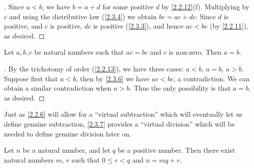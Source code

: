 \begin{proof}[]
  Since \(a < b\), we have \(b = a + d\) for some positive \(d\) by \cref{2.2.12}(f).
  Multiplying by \(c\) and using the distributive law (\cref{2.3.4}) we obtain \(bc = ac + dc\).
  Since \(d\) is positive, and \(c\) is positive, \(dc\) is positive (\cref{2.3.3}), and hence \(ac < bc\) (by \cref{2.2.11}), as desired.
\end{proof}

\begin{cor}\label{2.3.7}
  Let \(a, b, c\) be natural numbers such that \(ac = bc\) and \(c\) is non-zero.
  Then \(a = b\).
\end{cor}

\begin{proof}[]
  By the trichotomy of order (\cref{2.2.13}), we have three cases: \(a < b\), \(a = b\), \(a > b\).
  Suppose first that \(a < b\), then by \cref{2.3.6} we have \(ac < bc\), a contradiction.
  We can obtain a similar contradiction when \(a > b\).
  Thus the only possibility is that \(a = b\), as desired.
\end{proof}

\begin{rmk}\label{2.3.8}
  Just as \cref{2.2.6} will allow for a ``virtual subtraction'' which will eventually let us define genuine subtraction, \cref{2.3.7} provides a ``virtual division'' which will be needed to define genuine division later on.
\end{rmk}

\begin{prop}\label{2.3.9}
  Let \(n\) be a natural number, and let \(q\) be a positive number.
  Then there exist natural numbers \(m\), \(r\) such that \(0 \leq r < q\) and \(n = mq + r\).
\end{prop}

